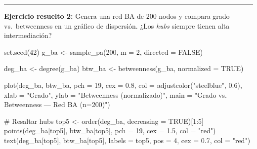 \documentclass[
  letterpaper,
  DIV=11,
  numbers=noendperiod]{scrreprt}
\newenvironment{Shaded}{\begin{snugshade}}{\end{snugshade}}
\newcommand{\AttributeTok}[1]{\textcolor[rgb]{0.40,0.45,0.13}{#1}}
\newcommand{\CommentTok}[1]{\textcolor[rgb]{0.37,0.37,0.37}{#1}}
\newcommand{\ConstantTok}[1]{\textcolor[rgb]{0.56,0.35,0.01}{#1}}
\newcommand{\DecValTok}[1]{\textcolor[rgb]{0.68,0.00,0.00}{#1}}
\newcommand{\FloatTok}[1]{\textcolor[rgb]{0.68,0.00,0.00}{#1}}
\newcommand{\FunctionTok}[1]{\textcolor[rgb]{0.28,0.35,0.67}{#1}}
\newcommand{\NormalTok}[1]{\textcolor[rgb]{0.00,0.23,0.31}{#1}}
\newcommand{\OtherTok}[1]{\textcolor[rgb]{0.00,0.23,0.31}{#1}}
\newcommand{\SpecialCharTok}[1]{\textcolor[rgb]{0.37,0.37,0.37}{#1}}
\newcommand{\StringTok}[1]{\textcolor[rgb]{0.13,0.47,0.30}{#1}}
\begin{document}
\begin{center}\rule{0.5\linewidth}{0.5pt}\end{center}

\textbf{Ejercicio resuelto 2:} Genera una red BA de 200 nodos y compara
grado vs.~betweenness en un gráfico de dispersión. ¿Los \emph{hubs}
siempre tienen alta intermediación?

\begin{tcolorbox}[enhanced jigsaw, toprule=.15mm, colframe=quarto-callout-tip-color-frame, coltitle=black, titlerule=0mm, colback=white, breakable, leftrule=.75mm, arc=.35mm, bottomtitle=1mm, toptitle=1mm, rightrule=.15mm, bottomrule=.15mm, left=2mm, title=\textcolor{quarto-callout-tip-color}{\faLightbulb}\hspace{0.5em}{📝 Solución}, colbacktitle=quarto-callout-tip-color!10!white, opacityback=0, opacitybacktitle=0.6]

\begin{Shaded}
\begin{Highlighting}[]
\FunctionTok{set.seed}\NormalTok{(}\DecValTok{42}\NormalTok{)}
\NormalTok{g\_ba }\OtherTok{\textless{}{-}} \FunctionTok{sample\_pa}\NormalTok{(}\DecValTok{200}\NormalTok{, }\AttributeTok{m =} \DecValTok{2}\NormalTok{, }\AttributeTok{directed =} \ConstantTok{FALSE}\NormalTok{)}

\NormalTok{deg\_ba }\OtherTok{\textless{}{-}} \FunctionTok{degree}\NormalTok{(g\_ba)}
\NormalTok{btw\_ba }\OtherTok{\textless{}{-}} \FunctionTok{betweenness}\NormalTok{(g\_ba, }\AttributeTok{normalized =} \ConstantTok{TRUE}\NormalTok{)}

\FunctionTok{plot}\NormalTok{(deg\_ba, btw\_ba,}
     \AttributeTok{pch =} \DecValTok{19}\NormalTok{, }\AttributeTok{cex =} \FloatTok{0.8}\NormalTok{,}
     \AttributeTok{col =} \FunctionTok{adjustcolor}\NormalTok{(}\StringTok{"steelblue"}\NormalTok{, }\FloatTok{0.6}\NormalTok{),}
     \AttributeTok{xlab =} \StringTok{"Grado"}\NormalTok{, }\AttributeTok{ylab =} \StringTok{"Betweenness (normalizado)"}\NormalTok{,}
     \AttributeTok{main =} \StringTok{"Grado vs. Betweenness — Red BA (n=200)"}\NormalTok{)}

\CommentTok{\# Resaltar hubs}
\NormalTok{top5 }\OtherTok{\textless{}{-}} \FunctionTok{order}\NormalTok{(deg\_ba, }\AttributeTok{decreasing =} \ConstantTok{TRUE}\NormalTok{)[}\DecValTok{1}\SpecialCharTok{:}\DecValTok{5}\NormalTok{]}
\FunctionTok{points}\NormalTok{(deg\_ba[top5], btw\_ba[top5], }\AttributeTok{pch =} \DecValTok{19}\NormalTok{, }\AttributeTok{cex =} \FloatTok{1.5}\NormalTok{, }\AttributeTok{col =} \StringTok{"red"}\NormalTok{)}
\FunctionTok{text}\NormalTok{(deg\_ba[top5], btw\_ba[top5], }\AttributeTok{labels =}\NormalTok{ top5, }\AttributeTok{pos =} \DecValTok{4}\NormalTok{, }\AttributeTok{cex =} \FloatTok{0.7}\NormalTok{, }\AttributeTok{col =} \StringTok{"red"}\NormalTok{)}


\end{Highlighting}
\end{Shaded}
\end{tcolorbox}
\end{document}
